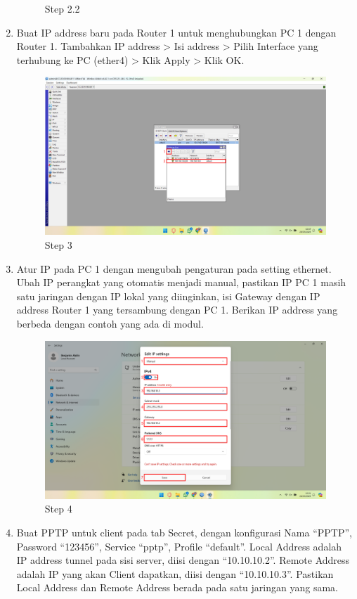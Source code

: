 \begin{center}
\begin{enumerate}
\begin{figure}[H]
			\caption{Step 2.2}
			\label{fig:Step 2.2(PC 1)}
		\end{figure}
        \item Buat IP address baru pada Router 1 untuk menghubungkan PC 1 dengan Router 1. Tambahkan IP address > Isi address > Pilih Interface yang terhubung ke PC (ether4) > Klik Apply > Klik OK.
        \begin{figure}[H]
			\centering
			\includegraphics[width=0.8\linewidth]{P4/img/pc1/Step 3.png}
			\caption{Step 3}
			\label{fig:Step 3(PC 1)}
		\end{figure}
        \item Atur IP pada PC 1 dengan mengubah pengaturan pada setting ethernet. Ubah IP perangkat yang otomatis menjadi manual, pastikan IP PC 1 masih satu jaringan dengan IP lokal yang diinginkan, isi Gateway dengan IP address Router 1 yang tersambung dengan PC 1. Berikan IP address yang berbeda dengan contoh yang ada di modul.
        \begin{figure}[H]
			\centering
			\includegraphics[width=0.8\linewidth]{P4/img/pc1/Step 4.png}
			\caption{Step 4}
			\label{fig:Step 4(PC 1)}
		\end{figure}
        \item Buat PPTP untuk client pada tab Secret, dengan konfigurasi Nama “PPTP”, Password “123456”, Service “pptp”, Profile “default”. Local Address adalah IP address tunnel pada sisi server, diisi dengan “10.10.10.2”. Remote Address adalah IP yang akan Client dapatkan, diisi dengan “10.10.10.3”. Pastikan Local Address dan Remote Address berada pada satu jaringan yang sama.

\end{enumerate}
\end{center}
